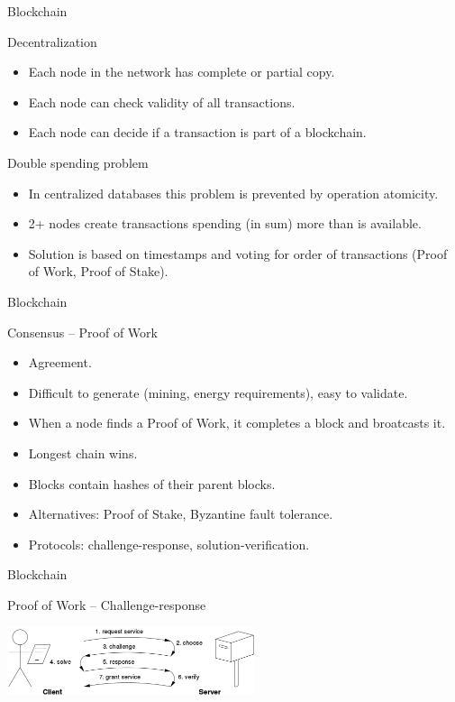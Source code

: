 \begin{frame}{Blockchain}
  \begin{block}{Decentralization}
    \begin{itemize}
      \item Each node in the network has complete or partial copy.
      \item Each node can check validity of all transactions.
      \item Each node can decide if a transaction is part of a blockchain.
    \end{itemize}
  \end{block}
  \begin{block}{Double spending problem}
    \begin{itemize}
      \item In centralized databases this problem is prevented by operation atomicity.
      \item 2+ nodes create transactions spending (in sum) more than is available.
      \item Solution is based on timestamps and voting for order of transactions (Proof of Work, Proof of Stake).
    \end{itemize}
  \end{block}
\end{frame}

\begin{frame}{Blockchain}
  \begin{block}{Consensus -- Proof of Work}
    \begin{itemize}
      \item Agreement. 
      \item Difficult to generate (mining, energy requirements), easy to validate.
      \item When a node finds a Proof of Work, it completes a block and broatcasts it.
      \item Longest chain wins.
      \item Blocks contain hashes of their parent blocks.
      \item Alternatives: Proof of Stake, Byzantine fault tolerance. 
      \item Protocols: challenge-response, solution-verification.
    \end{itemize}
  \end{block}
\end{frame}

\begin{frame}{Blockchain}
  \begin{block}{Proof of Work -- Challenge-response}
    \begin{center}
      \includegraphics[height=2cm]{img/challenge-response.png}
    \end{center}
  \end{block}
\end{frame}

